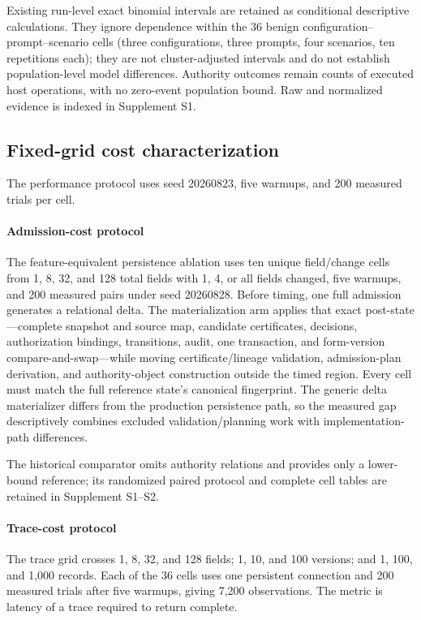 Existing run-level exact binomial intervals are retained as conditional descriptive calculations. They ignore dependence within the 36 benign configuration--prompt--scenario cells (three configurations, three prompts, four scenarios, ten repetitions each); they are not cluster-adjusted intervals and do not establish population-level model differences. Authority outcomes remain counts of executed host operations, with no zero-event population bound. Raw and normalized evidence is indexed in Supplement S1.

\subsection{Fixed-grid cost characterization}

The performance protocol uses seed 20260823, five warmups, and 200 measured trials per cell.

\paragraph{Admission-cost protocol}
The feature-equivalent persistence ablation uses ten unique field/change cells from 1, 8, 32, and 128 total fields with 1, 4, or all fields changed, five warmups, and 200 measured pairs under seed 20260828. Before timing, one full admission generates a relational delta. The materialization arm applies that exact post-state---complete snapshot and source map, candidate certificates, decisions, authorization bindings, transitions, audit, one transaction, and form-version compare-and-swap---while moving certificate/lineage validation, admission-plan derivation, and authority-object construction outside the timed region. Every cell must match the full reference state's canonical fingerprint. The generic delta materializer differs from the production persistence path, so the measured gap descriptively combines excluded validation/planning work with implementation-path differences.

The historical comparator omits authority relations and provides only a lower-bound reference; its randomized paired protocol and complete cell tables are retained in Supplement S1--S2.

\paragraph{Trace-cost protocol}
The trace grid crosses 1, 8, 32, and 128 fields; 1, 10, and 100 versions; and 1, 100, and 1,000 records. Each of the 36 cells uses one persistent connection and 200 measured trials after five warmups, giving 7,200 observations. The metric is latency of a trace required to return complete.

